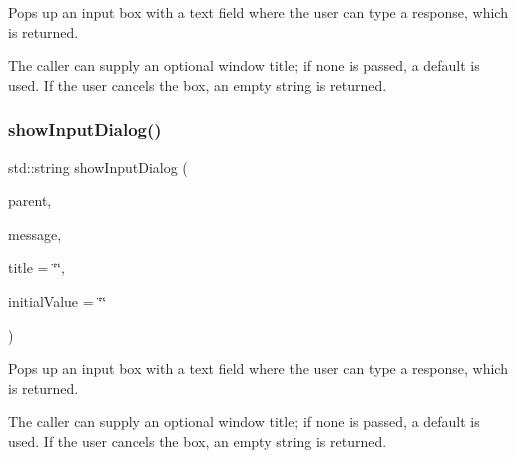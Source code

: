 Pops up an input box with a text field where the user can type a response, which is returned. 

The caller can supply an optional window title; if none is passed, a default is used. If the user cancels the box, an empty string is returned. \mbox{\label{classsgl_1_1GOptionPane_aabd3a04a3cdc998ee0e7e7e31676df17}} 
\subsubsection{\texorpdfstring{show\+Input\+Dialog()}{showInputDialog()}\hspace{0.1cm}{\footnotesize\ttfamily [3/3]}}
{\footnotesize\ttfamily std\+::string show\+Input\+Dialog (\begin{DoxyParamCaption}\item[{Q\+Widget $\ast$}]{parent,  }\item[{const std\+::string \&}]{message,  }\item[{const std\+::string \&}]{title = {\ttfamily \char`\"{}\char`\"{}},  }\item[{const std\+::string \&}]{initial\+Value = {\ttfamily \char`\"{}\char`\"{}} }\end{DoxyParamCaption})\hspace{0.3cm}{\ttfamily [static]}}



Pops up an input box with a text field where the user can type a response, which is returned. 

The caller can supply an optional window title; if none is passed, a default is used. If the user cancels the box, an empty string is returned. \mbox{\label{classsgl_1_1GOptionPane_af4df9c721d9e832e17953c9465bfd9ea}} 
